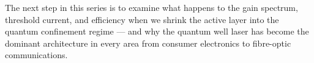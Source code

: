 The next step in this series is to examine what happens to the gain spectrum, threshold current, and efficiency when we shrink the active layer into the quantum confinement regime — and why the quantum well laser has become the dominant architecture in every area from consumer electronics to fibre-optic communications.
